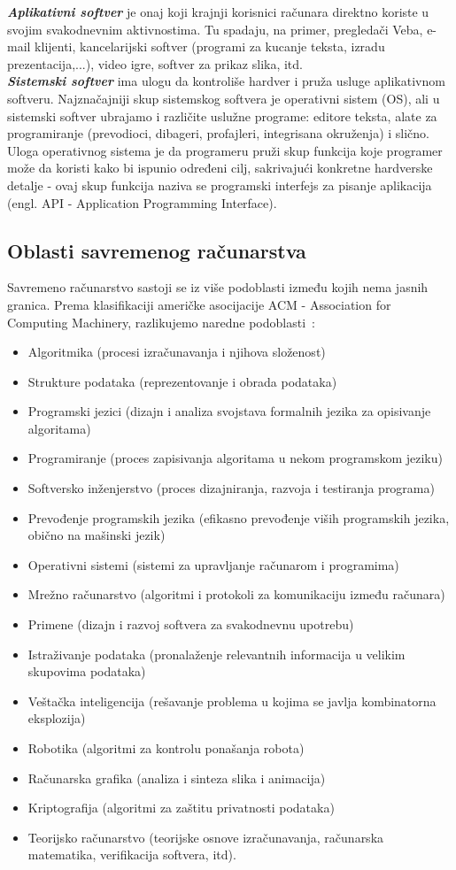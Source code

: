 \documentclass[a4paper]{article}
\begin{document}
\textbf{\em Aplikativni softver} je onaj koji krajnji korisnici računara direktno koriste u svojim svakodnevnim aktivnostima. Tu spadaju, na primer, pregledači Veba, e-mail klijenti, kancelarijski softver (programi za kucanje teksta, izradu prezentacija,...), video igre, softver za prikaz slika, itd.\\
\textbf{\em Sistemski softver} ima ulogu da kontroliše hardver i pruža usluge aplikativnom softveru. Najznačajniji skup sistemskog softvera je operativni sistem (OS), ali u sistemski softver ubrajamo i različite uslužne programe: editore teksta, alate za programiranje (prevodioci, dibageri, profajleri, integrisana okruženja) i slično. Uloga operativnog sistema je da programeru pruži skup funkcija koje programer može da koristi kako bi ispunio određeni cilj, sakrivajući konkretne hardverske detalje - ovaj skup funkcija naziva se programski interfejs za pisanje aplikacija (engl. API - Application Programming Interface).

\subsection{Oblasti savremenog računarstva}
Savremeno računarstvo sastoji se iz više podoblasti između kojih nema jasnih granica. Prema klasifikaciji američke asocijacije ACM - Association for Computing Machinery, razlikujemo naredne podoblasti~\cite{Janicic}:
\begin{itemize}
\item Algoritmika (procesi izračunavanja i njihova složenost)
\item Strukture podataka (reprezentovanje i obrada podataka)
\item Programski jezici (dizajn i analiza svojstava formalnih jezika za opisivanje
algoritama)
\item Programiranje (proces zapisivanja algoritama u nekom programskom jeziku)
\item Softversko inženjerstvo (proces dizajniranja, razvoja i testiranja programa)
\item Prevođenje programskih jezika (efikasno prevođenje viših programskih jezika,
obično na mašinski jezik)
\item Operativni sistemi (sistemi za upravljanje računarom i programima)
\item Mrežno računarstvo (algoritmi i protokoli za komunikaciju između računara)
\item Primene (dizajn i razvoj softvera za svakodnevnu upotrebu)
\item Istraživanje podataka (pronalaženje relevantnih informacija u velikim skupovima
podataka)
\item Veštačka inteligencija (rešavanje problema u kojima se javlja kombinatorna
eksplozija)
\item Robotika (algoritmi za kontrolu ponašanja robota)
\item Računarska grafika (analiza i sinteza slika i animacija)
\item Kriptografija (algoritmi za zaštitu privatnosti podataka)
\item Teorijsko računarstvo (teorijske osnove izračunavanja, računarska matematika,
verifikacija softvera, itd).
\end{itemize}
\end{document}
